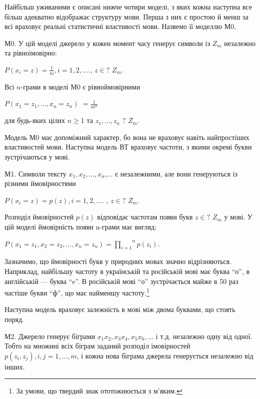 Найбільш уживаними є описані нижче чотири моделі, з яких кожна наступна все
більш адекватно відображає структуру мови. Перша з них є простою й менш за всі
враховує реальні статистичні властивості мови. Назвемо її моделлю М0.

М0. У цій моделі джерело у кожен момент часу генерує символи із  ${Z_{{m}}}$
незалежно та рівноімовірно:

{\centering
 ${P\left(x_{{i}}=z\right)=\frac{1}{m},i=1,2,\dots}$.,  
${z\in ?}$ ${Z_{{m}}}$.
\par}

Всі  ${n}${}-грами в моделі М0 є рівноймовірними

{\centering  ${P(x_{{1}}=z_{{1}},\dots,x_{{n}}=z_{{n}})}$
${=\frac{1}{m^{{n}}}}$\par}

для  будь-яких цілих  ${n\ge 1}$ та 
${z_{{1}},\dots,z_{{n}}}$ ${?}$ ${Z_{{m}}}$.

Модель М0 має допоміжний характер, бо вона не враховує навіть найпростіших
властивостей мови. Наступна модель ВТ враховує частоти, з якими окремі букви
зустрічаються у мові.

М1. Символи тексту  ${x_{{1}},x_{{2}},\dots,x_{{n}}}$,... є
незалежними, але вони генеруються із різними ймовірностями

{\centering
 ${P\left(x_{{i}}=z\right)=p(z),i=1,2,\dots}$.  ,  ${z\in ?}$
${Z_{{m}}}$.
\par}

Розподіл ймовірностей  ${p(z)}$ відповідає частотам появи букв  ${z\in ?}$
${Z_{{m}}}$ у мові. У цій моделі ймовірність появи n-грами має вигляд:

{\centering

${P\left(x_{{1}}=z_{{1}},x_{{2}}=z_{{2}},\dots,x_{{n}}=z_{{n}}\right)=\overset{{n}}{\underset{{i=1}}{\prod
}}{p(z_{{i}})}}$.
\par}

Зазначимо, що ймовірності букв у природних мовах значно відрізняються.
Наприклад, найбільшу частоту в українській та російській мові має буква “о”, в
англійській --- буква “e”. В російській мові “о” зустрічається майже в 50 раз
частіше букви “ф”, що має найменшу частоту.\footnote{ За умови, що твердий знак
ототожнюється з м’яким.}

Наступна модель враховує залежність в мові між двома буквами, що стоять поряд.

М2. Джерело генерує біграми 
${x_{{1}}x_{{2}},x_{{3}}x_{{4}},x_{{5}}x_{{6}},\dots}$ і
т.д. незалежно одну від одної. Тобто на множині всіх біграм заданий розподіл
імовірностей  ${p(z_{{i}},z_{{j}}),i,j=1,\dots,m}$, і кожна
нова біграма джерела генерується незалежно від інших.

